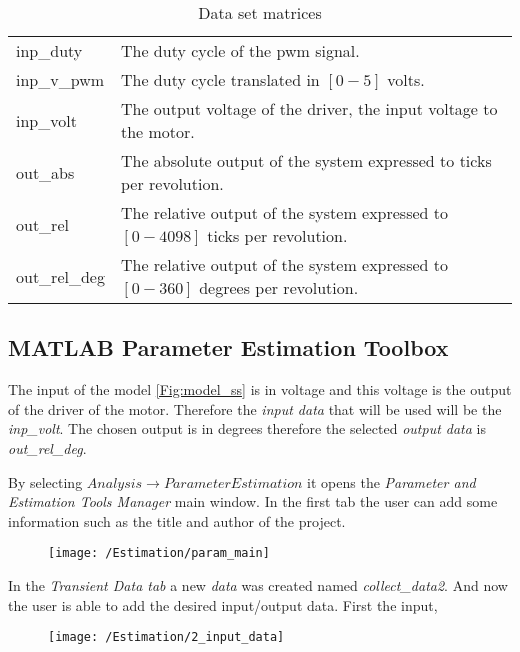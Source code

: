 \begin{table}
	\begin{tabular}{|l l|}
	\hline 
	inp\_duty &	The duty cycle of the pwm signal.\\
	inp\_v\_pwm & The duty cycle translated in $\left[0-5\right]$ volts.\\
	inp\_volt & The output voltage of the driver, the input voltage to the motor.\\
	out\_abs & The absolute output of the system expressed to ticks per revolution.\\
	out\_rel & The relative output of the system expressed to $\left[0-4098\right]$ ticks per revolution.\\
	out\_rel\_deg & The relative output of the system expressed to $\left[0-360\right]$ degrees per revolution.\\
	\hline
	\end{tabular}
	\caption{Data set matrices} 
\end{table}






\subsection{MATLAB Parameter Estimation Toolbox}

\noindent The input of the model \ref{Fig:model_ss} is in voltage and this voltage is the output of the driver of the motor. Therefore the \textit{input data} that will be used will be the \textit{inp\_volt}. The chosen output is in degrees therefore the selected \textit{output data} is \textit{out\_rel\_deg}.

By selecting \textit{$Analysis \rightarrow Parameter Estimation$} it opens the \textit{Parameter and Estimation Tools Manager} main window. In the first tab the user can add some information such as the title and author of the project.

\begin{figure}[h!]
	\texttt{[image: /Estimation/param\_main]}
\end{figure}	

\noindent In the \textit{Transient Data tab} a new \textit{data} was created named \textit{collect\_data2}. And now the user is able to add the desired input/output data.  First the input,

\begin{figure}[H]
	\texttt{[image: /Estimation/2\_input\_data]}
\end{figure}

